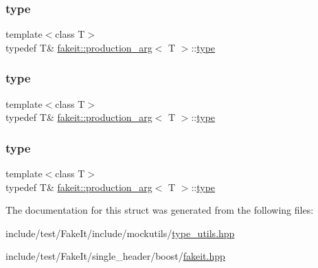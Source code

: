 \subsubsection{\texorpdfstring{type}{type}\hspace{0.1cm}{\footnotesize\ttfamily [7/9]}}
{\footnotesize\ttfamily template$<$class T$>$ \\
typedef T\& \mbox{\hyperlink{structfakeit_1_1production__arg}{fakeit\+::production\+\_\+arg}}$<$ T $>$\+::\mbox{\hyperlink{structfakeit_1_1production__arg_ade8b93fd6a2ff964755def8e4f87e69d}{type}}}

\mbox{\label{structfakeit_1_1production__arg_ade8b93fd6a2ff964755def8e4f87e69d}} 
\subsubsection{\texorpdfstring{type}{type}\hspace{0.1cm}{\footnotesize\ttfamily [8/9]}}
{\footnotesize\ttfamily template$<$class T$>$ \\
typedef T\& \mbox{\hyperlink{structfakeit_1_1production__arg}{fakeit\+::production\+\_\+arg}}$<$ T $>$\+::\mbox{\hyperlink{structfakeit_1_1production__arg_ade8b93fd6a2ff964755def8e4f87e69d}{type}}}

\mbox{\label{structfakeit_1_1production__arg_ade8b93fd6a2ff964755def8e4f87e69d}} 
\subsubsection{\texorpdfstring{type}{type}\hspace{0.1cm}{\footnotesize\ttfamily [9/9]}}
{\footnotesize\ttfamily template$<$class T$>$ \\
typedef T\& \mbox{\hyperlink{structfakeit_1_1production__arg}{fakeit\+::production\+\_\+arg}}$<$ T $>$\+::\mbox{\hyperlink{structfakeit_1_1production__arg_ade8b93fd6a2ff964755def8e4f87e69d}{type}}}



The documentation for this struct was generated from the following files\+:\begin{DoxyCompactItemize}
\item 
include/test/\+Fake\+It/include/mockutils/\mbox{\hyperlink{type__utils_8hpp}{type\+\_\+utils.\+hpp}}\item 
include/test/\+Fake\+It/single\+\_\+header/boost/\mbox{\hyperlink{single__header_2boost_2fakeit_8hpp}{fakeit.\+hpp}}\end{DoxyCompactItemize}
